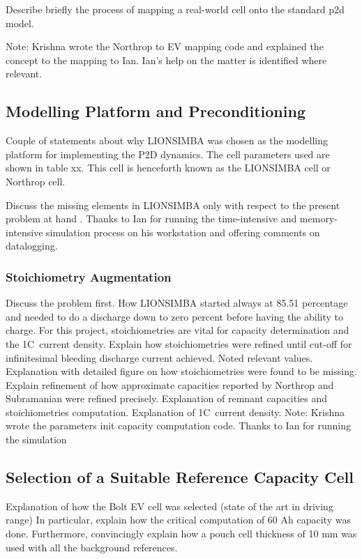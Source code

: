 Describe briefly  the process  of mapping  a real-world  cell onto  the standard
\gls{p2d} model.

Note: Krishna wrote the Northrop to EV mapping code and explained the concept to
the mapping to Ian. Ian's help on the matter is identified where relevant.

\subsection{Modelling Platform and Preconditioning}

Couple of  statements about why LIONSIMBA  was chosen as the  modelling platform
for implementing the  P2D dynamics. The cell parameters used  are shown in table
xx. This cell is henceforth known as the LIONSIMBA cell or Northrop cell.

Discuss  the missing  elements in  LIONSIMBA only  with respect  to the  present
problem  at hand  .  Thanks to  Ian  for running  the
time-intensive and  memory-intensive simulation  process on his  workstation and
offering comments on datalogging.

\subsubsection*{Stoichiometry Augmentation}
Discuss the problem first. How LIONSIMBA  started always at 85.51 percentage and
needed to  do a  discharge down  to zero  percent before  having the  ability to
charge. For this  project, stoichiometries are vital  for capacity determination
and  the 1C~current density.  Explain  how stoichiometries  were refined  until
cut-off for  infinitesimal bleeding  discharge current achieved.  Noted relevant
values. Explanation with detailed figure on how stoichiometries were found to be
missing. Explain refinement  of how approximate capacities  reported by Northrop
and Subramanian  were refined precisely.  Explanation of remnant  capacities and
stoichiometries computation.  Explanation of  1C~current density.  Note: Krishna
wrote the parameters  init capacity computation code. Thanks to  Ian for running
the simulation

\subsection{Selection of a Suitable Reference Capacity Cell}

Explanation of how  the Bolt EV cell  was selected (state of the  art in driving
range) In particular, explain how the critical computation of 60 Ah capacity was
done. Furthermore, convincingly explain how a  pouch cell thickness of 10 mm was
used with all the background references.

